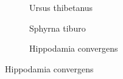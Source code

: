 \documentclass[times, utf8, diplomski]{fer}
\begin{document}
\begin{figure}
    \begin{subfigure}[b]{0.32\textwidth}
        \centering
        \caption{Ursus thibetanus}
        \label{fig:ursus_thibetanus}
    \end{subfigure}
        \begin{subfigure}[b]{0.32\textwidth}
        \centering
        \caption{Sphyrna tiburo}
        \label{fig:sphyrna_tiburo}
    \end{subfigure}
        \begin{subfigure}[b]{0.32\textwidth}
        \centering
        \caption{Hippodamia convergens}
        \label{fig:hippodamia_convergens}
    \end{subfigure}
    

\end{figure}
\end{document}
